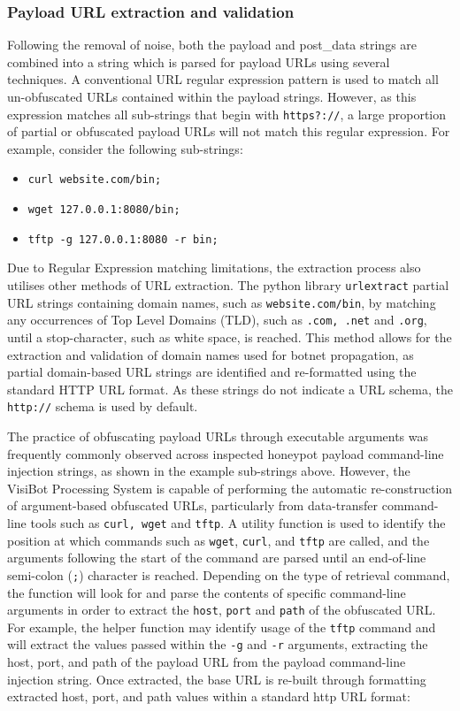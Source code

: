 \subsubsection{Payload URL extraction and validation} 

Following the removal of noise, both the payload and post\_data strings are combined into a string which is parsed for payload URLs using several techniques. A conventional URL regular expression pattern is used to match all un-obfuscated URLs contained within the payload strings. However, as this expression matches all sub-strings that begin with \texttt{https?://}, a large proportion of partial or obfuscated payload URLs will not match this regular expression. For example, consider the following sub-strings:

\begin{itemize}
    \item \texttt{curl website.com/bin;}
    \item \texttt{wget 127.0.0.1:8080/bin;}
    \item \texttt{tftp -g 127.0.0.1:8080 -r bin;}
\end{itemize}

Due to Regular Expression matching limitations, the extraction process also utilises other methods of URL extraction. The python library \texttt{urlextract} \citep{URLExtract} partial URL strings containing domain names, such as \texttt{website.com/bin}, by matching any occurrences of Top Level Domains (TLD), such as \texttt{.com, .net} and \texttt{.org}, until a stop-character, such as white space, is reached. This method allows for the extraction and validation of domain names used for botnet propagation, as partial domain-based URL strings are identified and re-formatted using the standard HTTP URL format. As these strings do not indicate a URL schema, the \texttt{http://} schema is used by default.

The practice of obfuscating payload URLs through executable arguments was frequently commonly observed across inspected honeypot payload command-line injection strings, as shown in the example sub-strings above. However, the VisiBot Processing System is capable of performing the automatic re-construction of argument-based obfuscated URLs, particularly from data-transfer command-line tools such as \texttt{curl, wget} and \texttt{tftp}. A utility function is used to identify the position at which commands such as \texttt{wget}, \texttt{curl}, and \texttt{tftp} are called, and the arguments following the start of the command are parsed until an end-of-line semi-colon (\texttt{;}) character is reached. Depending on the type of retrieval command, the function will look for and parse the contents of specific command-line arguments in order to extract the \texttt{host}, \texttt{port} and \texttt{path} of the obfuscated URL. For example, the helper function may identify usage of the \texttt{tftp} command and will extract the values passed within the \texttt{-g} and \texttt{-r} arguments, extracting the host, port, and path of the payload URL from the payload command-line injection string. Once extracted, the base URL is re-built through formatting extracted host, port, and path values within a standard http URL format: 


